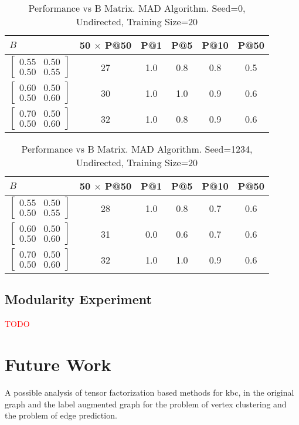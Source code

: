 \documentclass{tufte-handout}
\newcommand{\alert}[1]{\textcolor{red}{#1}}
\begin{document}
\begin{table}[htbp]
  \begin{tabular}{l c c c c c}
    $B$ & 50 $\times$ P@50 & P@1 & P@5 & P@10 & P@50 \\ \toprule
  $\begin{bmatrix} 0.55 & 0.50 \\0.50 &0.55 \end{bmatrix}$ & 27 & 1.0 & 0.8 & 0.8 & 0.5 \\
  $\begin{bmatrix} 0.60 & 0.50 \\0.50 &0.60 \end{bmatrix}$ & 30 & 1.0 & 1.0 & 0.9 & 0.6 \\
  $\begin{bmatrix} 0.70 & 0.50 \\0.50 &0.60 \end{bmatrix}$ & 32 & 1.0 & 0.8 & 0.9 & 0.6 \\
  \end{tabular}
  \caption{Performance vs B Matrix. MAD Algorithm. Seed=0, Undirected, Training Size=20}
  \label{tab:perf-vs-b}
\end{table}

\begin{table}[!htbp]
  \begin{tabular}{l c c c c c}
    $B$ & 50 $\times$ P@50 & P@1 & P@5 & P@10 & P@50 \\ \toprule
  $\begin{bmatrix} 0.55 & 0.50 \\0.50 &0.55 \end{bmatrix}$ & 28 & 1.0 & 0.8 & 0.7 & 0.6 \\
  $\begin{bmatrix} 0.60 & 0.50 \\0.50 &0.60 \end{bmatrix}$ & 31 & 0.0 & 0.6 & 0.7 & 0.6 \\
  $\begin{bmatrix} 0.70 & 0.50 \\0.50 &0.60 \end{bmatrix}$ & 32 & 1.0 & 1.0 & 0.9 & 0.6 \\
  \end{tabular}
  \caption{Performance vs B Matrix. MAD Algorithm. Seed=1234, Undirected, Training Size=20}
  \label{tab:perf-vs-b}
\end{table}



\subsection{Modularity Experiment}
\label{sec:modul-exper}
\alert{TODO}

\section{Future Work}
\label{sec:future-work}
A possible analysis of tensor factorization based methods for kbc, in the
original graph and the label augmented graph for the problem of vertex
clustering and the problem of edge prediction.



\end{document}
